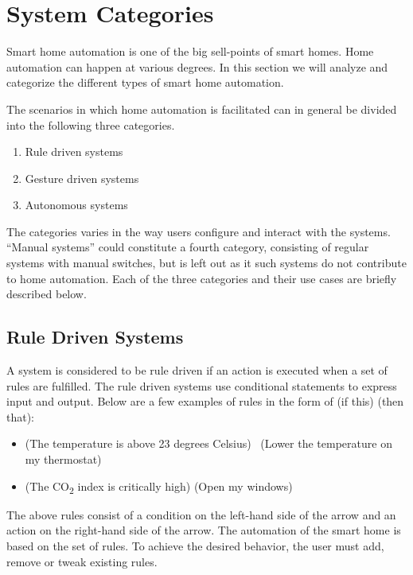 \section{System Categories}\label{sec:system-categories}
Smart home automation is one of the big sell-points of smart homes.
Home automation can happen at various degrees. 
In this section we will analyze and categorize the different types of smart home automation. 

The scenarios in which home automation is facilitated can in general be divided into the following three categories.

\begin{enumerate}
    \item Rule driven systems
    \item Gesture driven systems
    \item Autonomous systems
\end{enumerate}

The categories varies in the way users configure and interact with the systems. 
``Manual systems'' could constitute a fourth category, consisting of regular systems with manual switches,
but is left out as it such systems do not contribute to home automation.
Each of the three categories and their use cases are briefly described below.

\subsection{Rule Driven Systems}

A system is considered to be rule driven if an action is executed when a set of rules are fulfilled. 
The rule driven systems use conditional statements to express input and output. 
Below are a few examples of rules in the form of (if this) \textrightarrow (then that):

\begin{itemize}
    \item (The temperature is above 23 degrees Celsius) \textrightarrow~(Lower the temperature on my thermostat)
    \item (The CO\textsubscript{2} index is critically high) \textrightarrow (Open my windows)
\end{itemize}

The above rules consist of a condition on the left-hand side of the arrow and an action on the right-hand side of the arrow.
The automation of the smart home is based on the set of rules. 
To achieve the desired behavior, the user must add, remove or tweak existing rules.

